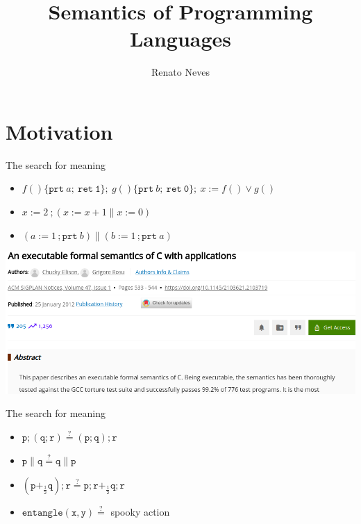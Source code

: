 \documentclass{beamer}
\author[Renato Neves]{Renato Neves}
\date{}
\begin{document}
\title{Semantics of Programming Languages}

\frame[plain]{\titlepage}
\section{Motivation}
\begin{frame}{ The search for meaning }

  \begin{examples}
    \begin{itemize}
            \item $f()\{ \mathtt{prt}\ a; \> \mathtt{ret \ 1} \} ;\
                g()\{ \mathtt{prt}\ b; \> \mathtt{ret \ 0} \};\
                x:= f() \vee g()$
                \\[10pt]
            \item $x:=2\ ; (x := x + 1 \parallel  x := 0)$ 
                \\[10pt]
            \item $(a:= 1\, ; \mathtt{prt}\ b) \parallel 
                    (b:= 1\, ; \mathtt{prt}\ a)$ 
    \end{itemize}
  \end{examples}

  \vfill
  \pause
  \centering 
  \includegraphics[scale=0.28]{images/c.png}
\end{frame}

\begin{frame}{ The search for meaning }
    \begin{examples}
    \begin{itemize}
            \item $\mathtt{p ; (q ; r)} \stackrel{?}{=} \mathtt{(p ; q) ; r} $
                    \\[10pt]
            \item $\mathtt{p \parallel q \stackrel{?}{=} q \parallel p} $ 
                    \\[10pt]
            \item $\mathtt{\left (p +_{\frac{1}{2}} q \right ) ; r 
                    \stackrel{?}{=} p ; r +_{\frac{1}{2}} q ; r}$ 
                    \\[10pt]
            \item $\mathtt{entangle(x,y) \stackrel{?}{=}}$ spooky action 
    \end{itemize}
  \end{examples}

  \pause
  \center
\end{frame}
\end{document}
